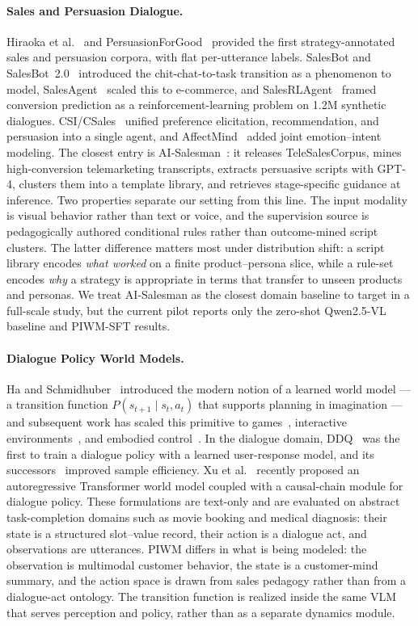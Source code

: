 \documentclass{article}
\begin{document}
\paragraph{Sales and Persuasion Dialogue.}
Hiraoka et al.~\cite{Hiraoka2016} and PersuasionForGood~\cite{PersuasionForGood} provided the first strategy-annotated sales and persuasion corpora, with flat per-utterance labels. SalesBot and SalesBot~2.0~\cite{SalesBot,SalesBot2} introduced the chit-chat-to-task transition as a phenomenon to model, SalesAgent~\cite{SalesAgent} scaled this to e-commerce, and SalesRLAgent~\cite{SalesRLAgent} framed conversion prediction as a reinforcement-learning problem on 1.2M synthetic dialogues. CSI/CSales~\cite{CSales} unified preference elicitation, recommendation, and persuasion into a single agent, and AffectMind~\cite{AffectMind} added joint emotion--intent modeling. The closest entry is AI-Salesman~\cite{AISalesman}: it releases TeleSalesCorpus, mines high-conversion telemarketing transcripts, extracts persuasive scripts with GPT-4, clusters them into a template library, and retrieves stage-specific guidance at inference. Two properties separate our setting from this line. The input modality is visual behavior rather than text or voice, and the supervision source is pedagogically authored conditional rules rather than outcome-mined script clusters. The latter difference matters most under distribution shift: a script library encodes \emph{what worked} on a finite product--persona slice, while a rule-set encodes \emph{why} a strategy is appropriate in terms that transfer to unseen products and personas. We treat AI-Salesman as the closest domain baseline to target in a full-scale study, but the current pilot reports only the zero-shot Qwen2.5-VL baseline and PIWM-SFT results.

\paragraph{Dialogue Policy World Models.}
Ha and Schmidhuber~\cite{HaSchmidhuber} introduced the modern notion of a learned world model --- a transition function $P(s_{t+1} \mid s_t, a_t)$ that supports planning in imagination --- and subsequent work has scaled this primitive to games~\cite{IRIS}, interactive environments~\cite{Genie}, and embodied control~\cite{DreamerV3}. In the dialogue domain, DDQ~\cite{DDQ} was the first to train a dialogue policy with a learned user-response model, and its successors~\cite{SwitchDDQ,BudgetDDQ,DRD3Q} improved sample efficiency. Xu et al.~\cite{XuCOLING} recently proposed an autoregressive Transformer world model coupled with a causal-chain module for dialogue policy. These formulations are text-only and are evaluated on abstract task-completion domains such as movie booking and medical diagnosis: their state is a structured slot--value record, their action is a dialogue act, and observations are utterances. PIWM differs in what is being modeled: the observation is multimodal customer behavior, the state is a customer-mind summary, and the action space is drawn from sales pedagogy rather than from a dialogue-act ontology. The transition function is realized inside the same VLM that serves perception and policy, rather than as a separate dynamics module.
\end{document}
